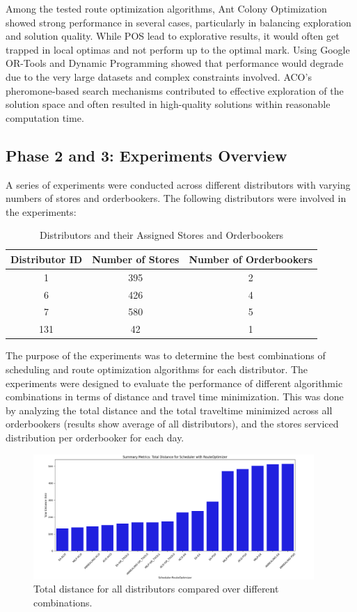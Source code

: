 Among the tested route optimization algorithms, Ant Colony Optimization showed strong performance in several cases, particularly in %
balancing exploration and solution quality. While POS lead to explorative results, it would often get trapped in local optimas and not 
perform up to the optimal mark. Using Google OR-Tools and Dynamic Programming showed that performance would degrade due to the very 
large datasets and complex constraints involved. ACO's pheromone-based search mechanisms contributed to effective exploration of the 
solution space and often resulted in high-quality solutions within reasonable computation time.


\subsection{Phase 2 and 3: Experiments Overview}
A series of experiments were conducted across different distributors with varying numbers of stores and orderbookers. The following distributors were involved in the experiments:
\begin{table}[h!]
\centering
\begin{tabular}{|c|c|c|}
\hline
\textbf{Distributor ID} & \textbf{Number of Stores} & \textbf{Number of Orderbookers} \\
\hline
1 & 395 & 2 \\
6 & 426 & 4 \\
7 & 580 & 5 \\
131 & 42 & 1 \\
\hline
\end{tabular}
\caption{Distributors and their Assigned Stores and Orderbookers}
\end{table}

The purpose of the experiments was to determine the best combinations of scheduling and route optimization algorithms for each distributor. The experiments were designed to evaluate the performance of different algorithmic combinations in terms of distance and travel time minimization.
This was done by analyzing the total distance and the total traveltime minimized across all orderbookers (results show average of all distributors), and the stores serviced distribution per orderbooker for each day.

\begin{figure}[H]
    \centering
    \includegraphics[width=0.95\textwidth]{images/results_distance_all_dis}
    \caption{Total distance for all distributors compared over different combinations.}
    \label{fig:results_distance_all_dis}
\end{figure}

